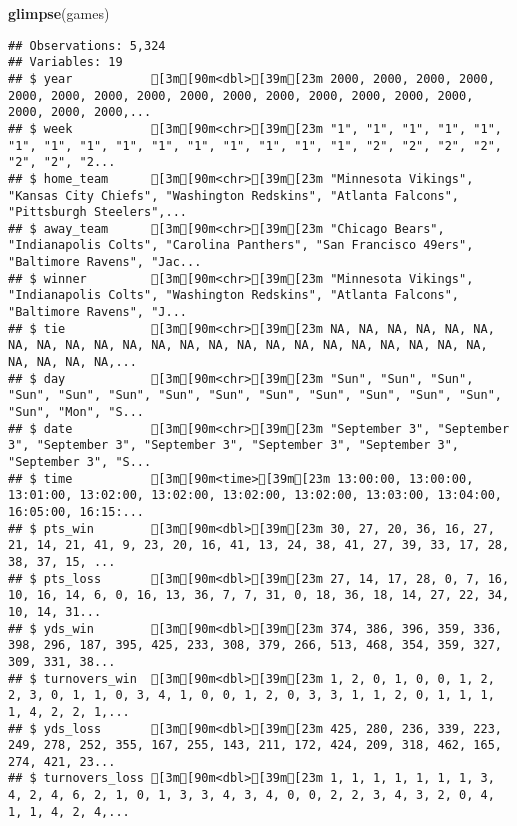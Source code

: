 \documentclass[
]{article}
\newenvironment{Shaded}{\begin{snugshade}}{\end{snugshade}}
\newcommand{\KeywordTok}[1]{\textcolor[rgb]{0.13,0.29,0.53}{\textbf{#1}}}
\newcommand{\NormalTok}[1]{#1}
\begin{document}
\begin{Shaded}
\begin{Highlighting}[]
\KeywordTok{glimpse}\NormalTok{(games)}
\end{Highlighting}
\end{Shaded}

\begin{verbatim}
## Observations: 5,324
## Variables: 19
## $ year           [3m[90m<dbl>[39m[23m 2000, 2000, 2000, 2000, 2000, 2000, 2000, 2000, 2000, 2000, 2000, 2000, 2000, 2000, 2000, 2000, 2000, 2000,...
## $ week           [3m[90m<chr>[39m[23m "1", "1", "1", "1", "1", "1", "1", "1", "1", "1", "1", "1", "1", "1", "1", "2", "2", "2", "2", "2", "2", "2...
## $ home_team      [3m[90m<chr>[39m[23m "Minnesota Vikings", "Kansas City Chiefs", "Washington Redskins", "Atlanta Falcons", "Pittsburgh Steelers",...
## $ away_team      [3m[90m<chr>[39m[23m "Chicago Bears", "Indianapolis Colts", "Carolina Panthers", "San Francisco 49ers", "Baltimore Ravens", "Jac...
## $ winner         [3m[90m<chr>[39m[23m "Minnesota Vikings", "Indianapolis Colts", "Washington Redskins", "Atlanta Falcons", "Baltimore Ravens", "J...
## $ tie            [3m[90m<chr>[39m[23m NA, NA, NA, NA, NA, NA, NA, NA, NA, NA, NA, NA, NA, NA, NA, NA, NA, NA, NA, NA, NA, NA, NA, NA, NA, NA, NA,...
## $ day            [3m[90m<chr>[39m[23m "Sun", "Sun", "Sun", "Sun", "Sun", "Sun", "Sun", "Sun", "Sun", "Sun", "Sun", "Sun", "Sun", "Sun", "Mon", "S...
## $ date           [3m[90m<chr>[39m[23m "September 3", "September 3", "September 3", "September 3", "September 3", "September 3", "September 3", "S...
## $ time           [3m[90m<time>[39m[23m 13:00:00, 13:00:00, 13:01:00, 13:02:00, 13:02:00, 13:02:00, 13:02:00, 13:03:00, 13:04:00, 16:05:00, 16:15:...
## $ pts_win        [3m[90m<dbl>[39m[23m 30, 27, 20, 36, 16, 27, 21, 14, 21, 41, 9, 23, 20, 16, 41, 13, 24, 38, 41, 27, 39, 33, 17, 28, 38, 37, 15, ...
## $ pts_loss       [3m[90m<dbl>[39m[23m 27, 14, 17, 28, 0, 7, 16, 10, 16, 14, 6, 0, 16, 13, 36, 7, 7, 31, 0, 18, 36, 18, 14, 27, 22, 34, 10, 14, 31...
## $ yds_win        [3m[90m<dbl>[39m[23m 374, 386, 396, 359, 336, 398, 296, 187, 395, 425, 233, 308, 379, 266, 513, 468, 354, 359, 327, 309, 331, 38...
## $ turnovers_win  [3m[90m<dbl>[39m[23m 1, 2, 0, 1, 0, 0, 1, 2, 2, 3, 0, 1, 1, 0, 3, 4, 1, 0, 0, 1, 2, 0, 3, 3, 1, 1, 2, 0, 1, 1, 1, 1, 4, 2, 2, 1,...
## $ yds_loss       [3m[90m<dbl>[39m[23m 425, 280, 236, 339, 223, 249, 278, 252, 355, 167, 255, 143, 211, 172, 424, 209, 318, 462, 165, 274, 421, 23...
## $ turnovers_loss [3m[90m<dbl>[39m[23m 1, 1, 1, 1, 1, 1, 1, 3, 4, 2, 4, 6, 2, 1, 0, 1, 3, 3, 4, 3, 4, 0, 0, 2, 2, 3, 4, 3, 2, 0, 4, 1, 1, 4, 2, 4,...

\end{verbatim}
\end{document}
